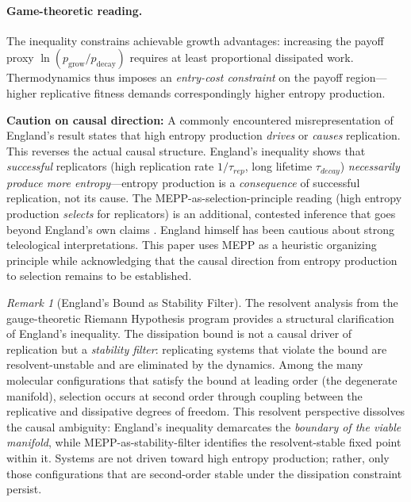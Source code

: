 \documentclass[12pt,a4paper]{article}
\theoremstyle{remark}
\newtheorem{remark}{Remark}
\begin{document}
\paragraph{Game-theoretic reading.} The inequality constrains achievable growth advantages: increasing the payoff proxy $\ln(p_{\mathrm{grow}} / p_{\mathrm{decay}})$ requires at least proportional dissipated work. Thermodynamics thus imposes an \emph{entry-cost constraint} on the payoff region---higher replicative fitness demands correspondingly higher entropy production.

\textbf{Caution on causal direction:} A commonly encountered misrepresentation of England's result states that high entropy production \emph{drives} or \emph{causes} replication. This reverses the actual causal structure. England's inequality shows that \emph{successful} replicators (high replication rate $1/\tau_{rep}$, long lifetime $\tau_{decay}$) \emph{necessarily produce more entropy}---entropy production is a \emph{consequence} of successful replication, not its cause. The MEPP-as-selection-principle reading (high entropy production \emph{selects} for replicators) is an additional, contested inference that goes beyond England's own claims \citep{England2013}. England himself has been cautious about strong teleological interpretations. This paper uses MEPP as a heuristic organizing principle while acknowledging that the causal direction from entropy production to selection remains to be established.

\begin{remark}[England's Bound as Stability Filter]
\label{rem:england-stability-filter}
The resolvent analysis from the gauge-theoretic Riemann Hypothesis program \citep{GeigerRH2026b} provides a structural clarification of England's inequality. The dissipation bound is not a causal driver of replication but a \emph{stability filter}: replicating systems that violate the bound are resolvent-unstable and are eliminated by the dynamics. Among the many molecular configurations that satisfy the bound at leading order (the degenerate manifold), selection occurs at second order through coupling between the replicative and dissipative degrees of freedom. This resolvent perspective dissolves the causal ambiguity: England's inequality demarcates the \emph{boundary of the viable manifold}, while MEPP-as-stability-filter identifies the resolvent-stable fixed point within it. Systems are not driven toward high entropy production; rather, only those configurations that are second-order stable under the dissipation constraint persist.
\end{remark}
\end{document}
